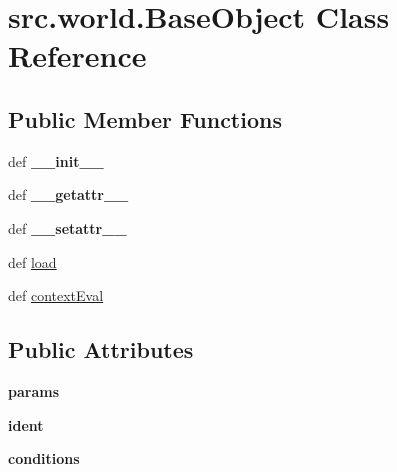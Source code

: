 \hypertarget{classsrc_1_1world_1_1_base_object}{\section{src.\-world.\-Base\-Object \-Class \-Reference}
\label{classsrc_1_1world_1_1_base_object}
}
\subsection*{\-Public \-Member \-Functions}
\begin{DoxyCompactItemize}
\item 
\hypertarget{classsrc_1_1world_1_1_base_object_af9b0564c504dbd3afa84fd94686c23a8}{def {\bfseries \-\_\-\-\_\-init\-\_\-\-\_\-}}\label{classsrc_1_1world_1_1_base_object_af9b0564c504dbd3afa84fd94686c23a8}

\item 
\hypertarget{classsrc_1_1world_1_1_base_object_a9b67f65105eff7e535a8a9e1fa59338c}{def {\bfseries \-\_\-\-\_\-getattr\-\_\-\-\_\-}}\label{classsrc_1_1world_1_1_base_object_a9b67f65105eff7e535a8a9e1fa59338c}

\item 
\hypertarget{classsrc_1_1world_1_1_base_object_a78786cb5d7d7c02cdf0c9644c67c35da}{def {\bfseries \-\_\-\-\_\-setattr\-\_\-\-\_\-}}\label{classsrc_1_1world_1_1_base_object_a78786cb5d7d7c02cdf0c9644c67c35da}

\item 
def \hyperlink{classsrc_1_1world_1_1_base_object_a41d299eac2ab4834a7296b7cdebd5c03}{load}
\item 
def \hyperlink{classsrc_1_1world_1_1_base_object_abb6543d76bbba0b253a9897df843986a}{context\-Eval}
\end{DoxyCompactItemize}
\subsection*{\-Public \-Attributes}
\begin{DoxyCompactItemize}
\item 
\hypertarget{classsrc_1_1world_1_1_base_object_a84a88c649a52e017a61ddbdddb733dae}{{\bfseries params}}\label{classsrc_1_1world_1_1_base_object_a84a88c649a52e017a61ddbdddb733dae}

\item 
\hypertarget{classsrc_1_1world_1_1_base_object_a61233869acaa51d9beddd921eca8c5ae}{{\bfseries ident}}\label{classsrc_1_1world_1_1_base_object_a61233869acaa51d9beddd921eca8c5ae}

\item 
\hypertarget{classsrc_1_1world_1_1_base_object_a1570d1f6e1840364f486839fbc1a6628}{{\bfseries conditions}}\label{classsrc_1_1world_1_1_base_object_a1570d1f6e1840364f486839fbc1a6628}

\end{DoxyCompactItemize}
